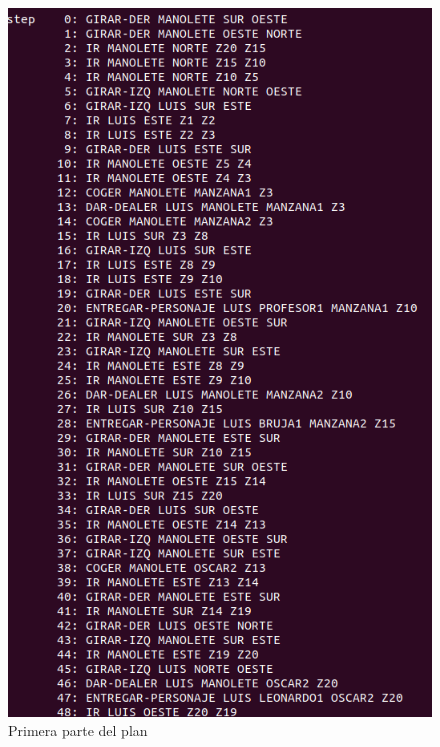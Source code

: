 \begin{figure}[H]
	\begin{minipage}[b]{0.5\linewidth}
		\centering
		\includegraphics[width=\linewidth]{ej7-1.png}
		\caption{Primera parte del plan}
		\label{fig:ej7-1}
	\end{minipage}
	\hspace{0.5cm}
	\begin{minipage}[b]{0.5\linewidth}
		\centering

\end{minipage}
\end{figure}
